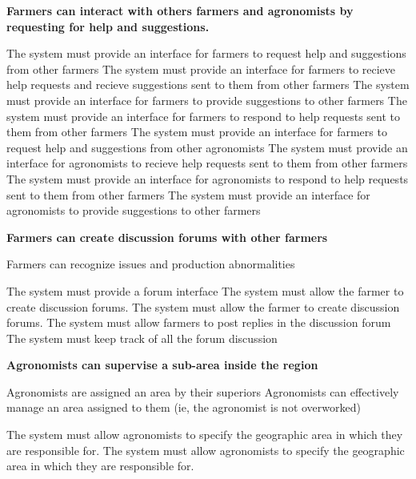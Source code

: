 \begin{itemize}
\begin{itemize}
\end{itemize}

 \textbf{Farmers can interact with others farmers and agronomists by requesting for help and suggestions.}

\begin{itemize}


 The system must provide an interface for farmers to request help and suggestions from other farmers
 The system must provide an interface for farmers to recieve help requests and recieve suggestions sent to them from other farmers
 The system must provide an interface for farmers to provide suggestions to other farmers
 The system must provide an interface for farmers to respond to help requests sent to them from other farmers
 The system must provide an interface for farmers to request help and suggestions from other agronomists
 The system must provide an interface for agronomists to recieve help requests sent to them from other farmers
 The system must provide an interface for agronomists to respond to help requests sent to them from other farmers 
 The system must provide an interface for agronomists to provide suggestions to other farmers
\end{itemize}

 \textbf{Farmers can create discussion forums with other farmers}
\begin{itemize}
 Farmers can recognize issues and production abnormalities


  The system must provide a forum interface
  The system must allow the farmer to create discussion forums.
  The system must allow the farmer to create discussion forums.
  The system must allow farmers to post replies in the discussion forum
  The system must keep track of all the forum discussion
\end{itemize}

 \textbf{Agronomists can supervise a sub-area inside the region}
\begin{itemize}
 Agronomists are assigned an area by their superiors
 Agronomists can effectively manage an area assigned to them (ie, the agronomist is not overworked)

 The system must allow agronomists to specify the geographic area in which they are responsible for.
 The system must allow agronomists to specify the geographic area in which they are responsible for.
\end{itemize}


\end{itemize}
